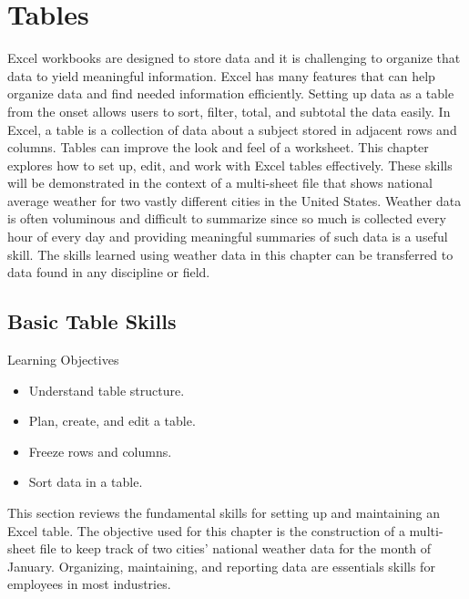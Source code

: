 \chapter{Tables}\label{ch05:tables}

Excel workbooks are designed to store data and it is challenging to organize that data to yield meaningful information. Excel has many features that can help organize data and find needed information efficiently. Setting up data as a table from the onset allows users to sort, filter, total, and subtotal the data easily. In Excel, a table is a collection of data about a subject stored in adjacent rows and columns. Tables can improve the look and feel of a worksheet. This chapter explores how to set up, edit, and work with Excel tables effectively. These skills will be demonstrated in the context of a multi-sheet file that shows national average weather for two vastly different cities in the United States. Weather data is often voluminous and difficult to summarize since so much is collected every hour of every day and providing meaningful summaries of such data is a useful skill. The skills learned using weather data in this chapter can be transferred to data found in any discipline or field.

\section{Basic Table Skills}

\begin{center}
	\begin{objbox}{Learning Objectives}
		\begin{itemize}
			\setlength{\itemsep}{0pt}
			\setlength{\parskip}{0pt}
			\setlength{\parsep}{0pt}
			
			\item Understand table structure.
			\item Plan, create, and edit a table.
			\item Freeze rows and columns.
			\item Sort data in a table.
		\end{itemize}
	\end{objbox}
\end{center}

This section reviews the fundamental skills for setting up and maintaining an Excel table. The objective used for this chapter is the construction of a multi-sheet file to keep track of two cities' national weather data for the month of January. Organizing, maintaining, and reporting data are essentials skills for employees in most industries.

